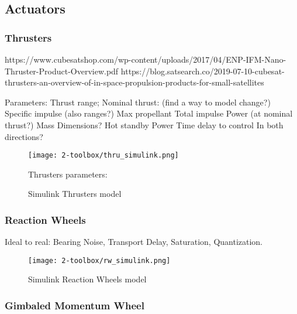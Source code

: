 \subsection{Actuators}

    \subsubsection{Thrusters}
        https://www.cubesatshop.com/wp-content/uploads/2017/04/ENP-IFM-Nano-Thruster-Product-Overview.pdf
        https://blog.satsearch.co/2019-07-10-cubesat-thrusters-an-overview-of-in-space-propulsion-products-for-small-satellites

        Parameters:
            Thrust range;
            Nominal thrust: (find a way to model change?)
            Specific impulse (also ranges?)
            Max propellant
            Total impulse
            Power (at nominal thrust?)
            Mass
            Dimensions?
            Hot standby Power
            Time delay to control
            In both directions? 


        \begin{figure}[hb]
            \centering
            \texttt{[image: 2-toolbox/thru\_simulink.png]}
            \caption{Simulink Thrusters model}
            \label{fig:thru_simulink}
            Thrusters parameters: 
        \end{figure}

    \subsubsection{Reaction Wheels}
        Ideal to real: Bearing Noise, Transport Delay, Saturation, Quantization.
        
        \begin{figure}[hb]
            \centering
            \texttt{[image: 2-toolbox/rw\_simulink.png]}
            \caption{Simulink Reaction Wheels model}
            \label{fig:rw_simulink}
        \end{figure}
        \subsubsection{Gimbaled Momentum Wheel}
